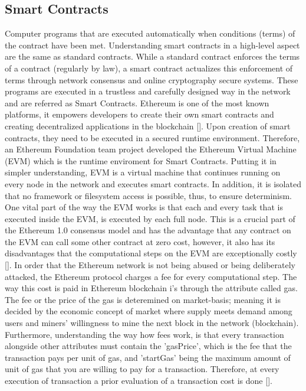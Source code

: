 \subsection{Smart Contracts}
Computer programs that are executed automatically when conditions (terms) of the contract have been met. Understanding smart contracts in a high-level aspect are the same as standard contracts. While a standard contract enforces the terms of a contract (regularly by law), a smart contract actualizes this enforcement of terms through network consensus and online cryptography secure systems. These programs are executed in a trustless and carefully designed way in the network and are referred as Smart Contracts. Ethereum is one of the most known platforms, it empowers developers to create their own smart contracts and creating decentralized applications in the blockchain [\cite{Buterin2014}]. Upon creation of smart contracts, they need to be executed in a secured runtime environment. Therefore, an Ethereum Foundation team project developed the Ethereum Virtual Machine (EVM) which is the runtime enviroment for Smart Contracts. Putting it in simpler understanding, EVM is a virtual machine that continues running on every node in the network and executes smart contracts. In addition, it is isolated that no framework or filesystem access is possible, thus, to ensure determinism. One vital part of the way the EVM works is that each and every task that is executed inside the EVM, is executed by each full node. This is a crucial part of the Ethereum 1.0 consensus model and has the advantage that any contract on the EVM can call some other contract at zero cost, however, it also has its disadvantages that the computational steps on the EVM are exceptionally costly [\cite{Buterin2014}]. In order that the Ethereum network is not being abused or being deliberately attacked, the Ethereum protocol charges a fee for every computational step. The way this cost is paid in Ethereum blockchain i’s through the attribute called gas. The fee or the price of the gas is deteremined on market-basis; meaning it is decided by the economic concept of market where supply meets demand among users and miners' willingness to mine the next block in the network (blockchain). Furthermore, understanding the way how fees work, is that every transaction alongside other attributes must contain the 'gasPrice', which is the fee that the transaction pays per unit of gas, and 'startGas' being the maximum amount of unit of gas that you are willing to pay for a transaction. Therefore, at every execution of transaction a prior evaluation of a transaction cost is done [\cite{Buterin2014}].
